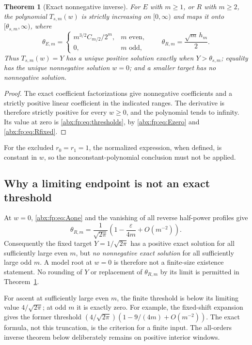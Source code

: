 \documentclass[11pt,letterpaper]{article}
\numberwithin{equation}{section}
\newtheorem{theorem}{Theorem}[section]
\theoremstyle{remark}\newtheorem{remark}[theorem]{Remark}
\newcommand{\eps}{\varepsilon}
\newcommand{\sq}{\sqrt{2\pi}}
\begin{document}
\begin{theorem}[Exact nonnegative inverse]\label{abx:fp:thm:exactinverse}
For $E$ with $m\ge1$, or $R$ with $m\ge2$, the polynomial
$T_{s,m}(w)$ is strictly increasing on $[0,\infty)$ and maps it onto
$[\theta_{s,m},\infty)$, where
\begin{equation}\label{abx:fp:eq:thresholds}
 \theta_{E,m}=\begin{cases}m^{3/2}C_{m/2}/2^m,&m\text{ even},\\0,&m\text{ odd},\end{cases}
 \qquad
 \theta_{R,m}=\frac{\sqrt m\,h_m}{2}.
\end{equation}
Thus $T_{s,m}(w)=Y$ has a unique positive solution exactly when
$Y>\theta_{s,m}$; equality has the unique nonnegative solution $w=0$;
and a smaller target has no nonnegative solution.
\end{theorem}
\begin{proof}
The exact coefficient factorizations give nonnegative coefficients and
a strictly positive linear coefficient in the indicated ranges. The
derivative is therefore strictly positive for every $w\ge0$, and
the polynomial tends to infinity. Its value at zero is
\eqref{abx:fp:eq:thresholds}, by \eqref{abx:fp:eq:Ezero} and \eqref{abx:fp:eq:Rfixed}.
\end{proof}
For the excluded $r_0=r_1=1$, the normalized expression, when defined,
is constant in $w$, so the nonconstant-polynomial conclusion must not
be applied.

\subsection{Why a limiting endpoint is not an exact threshold}\label{abx:fp:sub:endpoint}
At $w=0$, \eqref{abx:fp:eq:Aone} and the vanishing of all reverse half-power
profiles give
\begin{equation}\label{abx:fp:eq:endpoint}
 \theta_{R,m}=\frac1{\sq}\left(1-\frac{\eps}{4m}
                                      +O(m^{-2})\right).
\end{equation}
Consequently the fixed target $Y=1/\sq$ has a positive exact solution
for all sufficiently large even $m$, but \emph{no nonnegative exact
solution} for all sufficiently large odd $m$. A model root at $w=0$
is therefore not a finite-size existence statement. No rounding of
$Y$ or replacement of $\theta_{R,m}$ by its limit is permitted in
Theorem~\ref{abx:fp:thm:exactinverse}.

For ascent at sufficiently large even $m$, the finite threshold is
below its limiting value $4/\sq$; at odd $m$ it is exactly zero. For example, the
fixed-shift expansion gives the former threshold
$(4/\sq)(1-9/(4m)+O(m^{-2}))$. The exact formula, not this truncation,
is the criterion for a finite input. The all-orders inverse theorem
below deliberately remains on positive interior windows.
\end{document}
